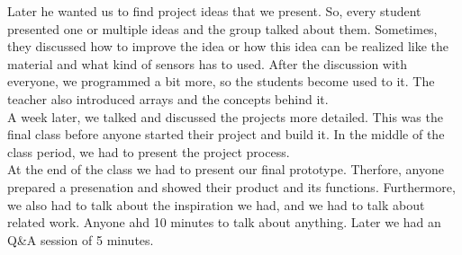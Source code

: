 \documentclass[00_doc.tex]{subfiles}
\begin{document}
\begin{flushleft}
        Later he wanted us to find project ideas that we present. So, every student presented one 
        or multiple ideas and the group talked about them. Sometimes, they discussed how to improve 
        the idea or how this idea can be realized like the material and what kind of sensors has to
        used. After the discussion with everyone, we programmed a bit more, so the students become 
        used to it. The teacher also introduced arrays and the concepts behind it. \\

        A week later, we talked and discussed the projects more detailed. This was the final class 
        before anyone started their project and build it. In the middle of the class period, we had 
        to present the project process.  \\
        At the end of the class we had to present our final prototype. Therfore, anyone prepared a 
        presenation and showed their product and its functions. Furthermore, we also had to talk about 
        the inspiration we had, and we had to talk about related work. Anyone ahd 10 minutes to talk
        about anything. Later we had an Q\&A session of 5 minutes.
    \end{flushleft}
\end{document}
